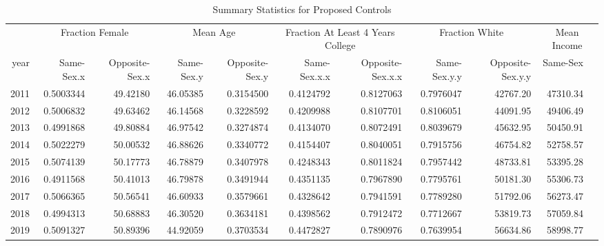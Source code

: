 \documentclass[]{article}
\begin{document}
\begin{table}

\caption{Summary Statistics for Proposed Controls}
\centering
\begin{tabular}[t]{r|r|r|r|r|r|r|r|r|r}
\hline
\multicolumn{1}{c|}{ } & \multicolumn{2}{c|}{Fraction Female} & \multicolumn{2}{c|}{Mean Age} & \multicolumn{2}{c|}{Fraction At Least 4 Years College} & \multicolumn{2}{c|}{Fraction White} & \multicolumn{2}{c}{Mean Income} \\
\cline{2-3} \cline{4-5} \cline{6-7} \cline{8-9} \cline{10-11}
year & Same-Sex.x & Opposite-Sex.x & Same-Sex.y & Opposite-Sex.y & Same-Sex.x.x & Opposite-Sex.x.x & Same-Sex.y.y & Opposite-Sex.y.y & Same-Sex\\
\hline
2011 & 0.5003344 & 49.42180 & 46.05385 & 0.3154500 & 0.4124792 & 0.8127063 & 0.7976047 & 42767.20 & 47310.34\\
\hline
2012 & 0.5006832 & 49.63462 & 46.14568 & 0.3228592 & 0.4209988 & 0.8107701 & 0.8106051 & 44091.95 & 49406.49\\
\hline
2013 & 0.4991868 & 49.80884 & 46.97542 & 0.3274874 & 0.4134070 & 0.8072491 & 0.8039679 & 45632.95 & 50450.91\\
\hline
2014 & 0.5022279 & 50.00532 & 46.88626 & 0.3340772 & 0.4154407 & 0.8040051 & 0.7915756 & 46754.82 & 52758.57\\
\hline
2015 & 0.5074139 & 50.17773 & 46.78879 & 0.3407978 & 0.4248343 & 0.8011824 & 0.7957442 & 48733.81 & 53395.28\\
\hline
2016 & 0.4911568 & 50.41013 & 46.79878 & 0.3491944 & 0.4351135 & 0.7967890 & 0.7795761 & 50181.30 & 55306.73\\
\hline
2017 & 0.5066365 & 50.56541 & 46.60933 & 0.3579661 & 0.4328642 & 0.7941591 & 0.7789280 & 51792.06 & 56273.47\\
\hline
2018 & 0.4994313 & 50.68883 & 46.30520 & 0.3634181 & 0.4398562 & 0.7912472 & 0.7712667 & 53819.73 & 57059.84\\
\hline
2019 & 0.5091327 & 50.89396 & 44.92059 & 0.3703534 & 0.4472827 & 0.7890976 & 0.7639954 & 56634.86 & 58998.77\\
\hline
\end{tabular}
\end{table}
\end{document}
